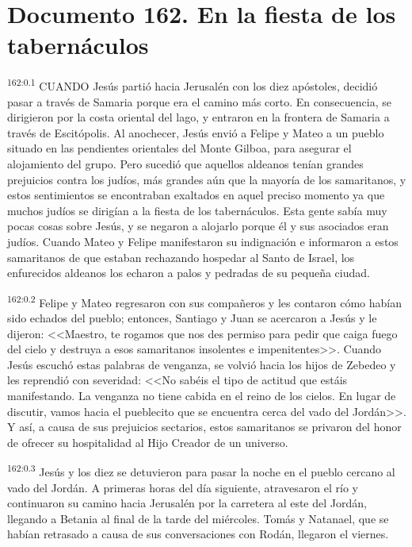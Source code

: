 \chapter{Documento 162. En la fiesta de los tabernáculos}
\par 
\textsuperscript{162:0.1} CUANDO Jesús partió hacia Jerusalén con los diez apóstoles, decidió pasar a través de Samaria porque era el camino más corto. En consecuencia, se dirigieron por la costa oriental del lago, y entraron en la frontera de Samaria a través de Escitópolis. Al anochecer, Jesús envió a Felipe y Mateo a un pueblo situado en las pendientes orientales del Monte Gilboa, para asegurar el alojamiento del grupo. Pero sucedió que aquellos aldeanos tenían grandes prejuicios contra los judíos, más grandes aún que la mayoría de los samaritanos, y estos sentimientos se encontraban exaltados en aquel preciso momento ya que muchos judíos se dirigían a la fiesta de los tabernáculos. Esta gente sabía muy pocas cosas sobre Jesús, y se negaron a alojarlo porque él y sus asociados eran judíos. Cuando Mateo y Felipe manifestaron su indignación e informaron a estos samaritanos de que estaban rechazando hospedar al Santo de Israel, los enfurecidos aldeanos los echaron a palos y pedradas de su pequeña ciudad.

\par 
\textsuperscript{162:0.2} Felipe y Mateo regresaron con sus compañeros y les contaron cómo habían sido echados del pueblo; entonces, Santiago y Juan se acercaron a Jesús y le dijeron: <<Maestro, te rogamos que nos des permiso para pedir que caiga fuego del cielo y destruya a esos samaritanos insolentes e impenitentes>>. Cuando Jesús escuchó estas palabras de venganza, se volvió hacia los hijos de Zebedeo y les reprendió con severidad: <<No sabéis el tipo de actitud que estáis manifestando. La venganza no tiene cabida en el reino de los cielos. En lugar de discutir, vamos hacia el pueblecito que se encuentra cerca del vado del Jordán>>. Y así, a causa de sus prejuicios sectarios, estos samaritanos se privaron del honor de ofrecer su hospitalidad al Hijo Creador de un universo.

\par 
\textsuperscript{162:0.3} Jesús y los diez se detuvieron para pasar la noche en el pueblo cercano al vado del Jordán. A primeras horas del día siguiente, atravesaron el río y continuaron su camino hacia Jerusalén por la carretera al este del Jordán, llegando a Betania al final de la tarde del miércoles. Tomás y Natanael, que se habían retrasado a causa de sus conversaciones con Rodán, llegaron el viernes.

